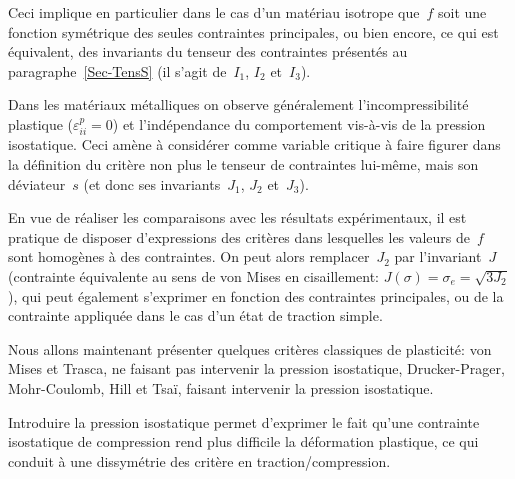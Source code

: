 Ceci implique en particulier dans le cas d'un matériau isotrope que~$f$ soit une fonction symétrique des
seules contraintes principales, ou bien encore, ce qui est équivalent, des invariants du tenseur des contraintes
présentés au paragraphe~\ref{Sec-TensS} (il s'agit de~$I_1$, $I_2$ et~$I_3$).

\medskip
Dans les matériaux métalliques on observe généralement l'incompressibilité plastique ($\varepsilon^p_{ii} = 0$)
et l'indépendance du comportement vis-à-vis de la pression isostatique. Ceci amène à considérer
comme variable critique à faire figurer dans la définition du critère non plus le tenseur de contraintes lui-même,
mais son déviateur~$s$ (et donc ses invariants~$J_1$, $J_2$ et~$J_3$).

En vue de réaliser les comparaisons avec les résultats expérimentaux, il est pratique de disposer d'expressions
des critères dans lesquelles les valeurs de~$f$ sont homogènes à des contraintes.
On peut alors remplacer~$J_2$ par l'invariant~$J$ (contrainte équivalente au sens de von Mises en cisaillement:
$J(\sigma)=\sigma_e= \sqrt{3J_2}$), qui peut également s'exprimer en fonction des contraintes principales,
ou de la contrainte appliquée dans le cas d'un état de traction simple.

\medskip
Nous allons maintenant présenter quelques critères classiques de plasticité: von Mises et Trasca, ne faisant
pas intervenir la pression isostatique, Drucker-Prager, Mohr-Coulomb, Hill et Tsaï, faisant intervenir
la pression isostatique.

Introduire la pression isostatique permet d'exprimer le fait qu'une contrainte isostatique de compression
rend plus difficile la déformation plastique, ce qui conduit à une dissymétrie des critère en
traction/compression.

